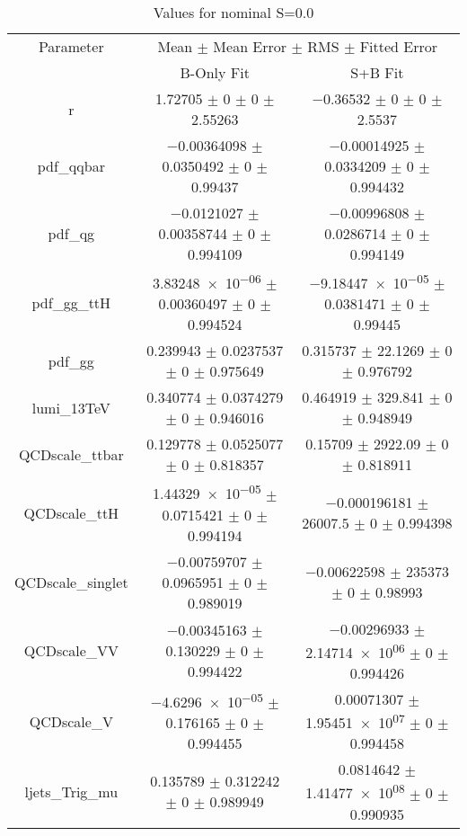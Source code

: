 \begin{table}
\centering
\caption{Values for nominal S=0.0}
\begin{tabular}{ccc}
\toprule
Parameter & \multicolumn{2}{c}{Mean $\pm$ Mean Error $\pm$ RMS $\pm$ Fitted Error}\\
 & B-Only Fit & S+B Fit\\
\midrule
r & \num{1.72705} $\pm$ \num{0} $\pm$ \num{0} $\pm$ \num{2.55263} & \num{-0.36532} $\pm$ \num{0} $\pm$ \num{0} $\pm$ \num{2.5537}\\
pdf\_qqbar & \num{-0.00364098} $\pm$ \num{0.0350492} $\pm$ \num{0} $\pm$ \num{0.99437} & \num{-0.00014925} $\pm$ \num{0.0334209} $\pm$ \num{0} $\pm$ \num{0.994432}\\
pdf\_qg & \num{-0.0121027} $\pm$ \num{0.00358744} $\pm$ \num{0} $\pm$ \num{0.994109} & \num{-0.00996808} $\pm$ \num{0.0286714} $\pm$ \num{0} $\pm$ \num{0.994149}\\
pdf\_gg\_ttH & \num{3.83248e-06} $\pm$ \num{0.00360497} $\pm$ \num{0} $\pm$ \num{0.994524} & \num{-9.18447e-05} $\pm$ \num{0.0381471} $\pm$ \num{0} $\pm$ \num{0.99445}\\
pdf\_gg & \num{0.239943} $\pm$ \num{0.0237537} $\pm$ \num{0} $\pm$ \num{0.975649} & \num{0.315737} $\pm$ \num{22.1269} $\pm$ \num{0} $\pm$ \num{0.976792}\\
lumi\_13TeV & \num{0.340774} $\pm$ \num{0.0374279} $\pm$ \num{0} $\pm$ \num{0.946016} & \num{0.464919} $\pm$ \num{329.841} $\pm$ \num{0} $\pm$ \num{0.948949}\\
QCDscale\_ttbar & \num{0.129778} $\pm$ \num{0.0525077} $\pm$ \num{0} $\pm$ \num{0.818357} & \num{0.15709} $\pm$ \num{2922.09} $\pm$ \num{0} $\pm$ \num{0.818911}\\
QCDscale\_ttH & \num{1.44329e-05} $\pm$ \num{0.0715421} $\pm$ \num{0} $\pm$ \num{0.994194} & \num{-0.000196181} $\pm$ \num{26007.5} $\pm$ \num{0} $\pm$ \num{0.994398}\\
QCDscale\_singlet & \num{-0.00759707} $\pm$ \num{0.0965951} $\pm$ \num{0} $\pm$ \num{0.989019} & \num{-0.00622598} $\pm$ \num{235373} $\pm$ \num{0} $\pm$ \num{0.98993}\\
QCDscale\_VV & \num{-0.00345163} $\pm$ \num{0.130229} $\pm$ \num{0} $\pm$ \num{0.994422} & \num{-0.00296933} $\pm$ \num{2.14714e+06} $\pm$ \num{0} $\pm$ \num{0.994426}\\
QCDscale\_V & \num{-4.6296e-05} $\pm$ \num{0.176165} $\pm$ \num{0} $\pm$ \num{0.994455} & \num{0.00071307} $\pm$ \num{1.95451e+07} $\pm$ \num{0} $\pm$ \num{0.994458}\\
ljets\_Trig\_mu & \num{0.135789} $\pm$ \num{0.312242} $\pm$ \num{0} $\pm$ \num{0.989949} & \num{0.0814642} $\pm$ \num{1.41477e+08} $\pm$ \num{0} $\pm$ \num{0.990935}\\

\end{tabular}
\end{table}
